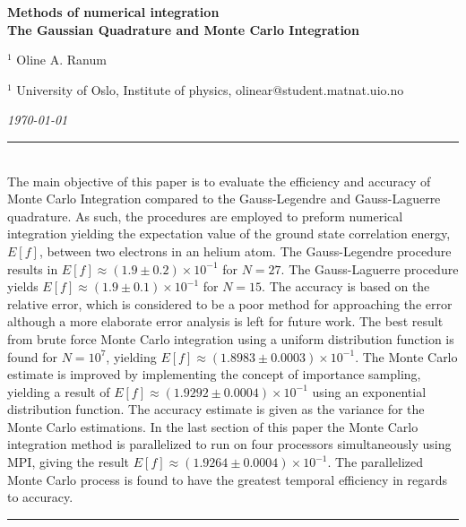 \documentclass[%
reprint,nofootinbib,
amsmath,amssymb,
aps,
]{revtex4-1}
\newcommand{\HRule}{\rule{\textwidth}{0.5mm}}
\begin{document}
\onecolumngrid

\begin{center}
	\large\textbf{Methods of numerical integration\\ \small{The Gaussian Quadrature and Monte Carlo Integration}}
\end{center}
\vspace{5mm}

\begin{center}
	\small{$^1$ Oline A. Ranum}\\
\end{center}

\begin{center}
	\small{$^1$ University of Oslo, Institute of physics, 
		olinear@student.matnat.uio.no}
\end{center}

\begin{center}
	\textit{\today}
\end{center}
\vspace{7mm}
\noindent 
\HRule \vspace{2mm}\\
The main objective of this paper is to evaluate the efficiency and accuracy of Monte Carlo Integration compared to the Gauss-Legendre and Gauss-Laguerre quadrature. As such, the procedures are employed to preform numerical integration yielding the expectation value of the ground state correlation energy, $E[f]$, between two electrons in an helium atom. The Gauss-Legendre procedure results in $E[f] \approx (1.9 \pm 0.2)\times 10^{-1}$ for $N=27$. The Gauss-Laguerre procedure yields $E[f]\approx (1.9 \pm 0.1)\times 10^{-1}$ for $N=15$. The accuracy is based on the relative error, which is considered to be a poor method for approaching the error although a more elaborate error analysis is left for future work. The best result from brute force Monte Carlo integration using a uniform distribution function is found for $N=10^7$, yielding $E[f]\approx (1.8983 \pm 0.0003)\times 10^{-1}$. The Monte Carlo estimate is improved by implementing the concept of importance sampling, yielding a result of $E[f]\approx (1.9292 \pm 0.0004)\times 10^{-1}$ using an exponential distribution function. The accuracy estimate is given as the variance for the Monte Carlo estimations. In the last section of this paper the Monte Carlo integration method is parallelized to run on four processors simultaneously using MPI, giving the result $E[f]\approx (1.9264 \pm 0.0004)\times 10^{-1}$. The parallelized Monte Carlo process is found to have the greatest temporal efficiency in regards to accuracy. 
\vspace{1.5mm}  \\
\HRule
\vspace{0.3cm}
\end{document}
